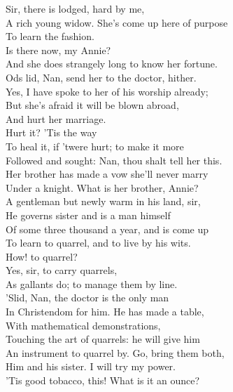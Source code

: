\documentclass[a4paper,oneside,12pt]{memoir}
\begin{document}
\begin{drama*}
\druggerspeaks {} Sir, there is lodged, hard by me,\\
A rich young widow. She's come up here of purpose\\
To learn the fashion.\\
\facespeaks {} Is there now, my Annie?\\
\druggerspeaks And she does strangely long to know her fortune.\\
\facespeaks Ods lid, Nan, send her to the doctor, hither.\\
\druggerspeaks Yes, I have spoke to her of his worship already;\\
But she's afraid it will be blown abroad,\\
And hurt her marriage.\\
\facespeaks {} Hurt it? 'Tis the way\\
To heal it, if 'twere hurt; to make it more\\
Followed and sought: Nan, thou shalt tell her this.\\
\druggerspeaks Her brother has made a vow she'll never marry\\
Under a knight.
\facespeaks {} What is her brother, Annie?\\
\druggerspeaks A gentleman but newly warm in his land, sir,\\
He governs sister and is a man himself\\
Of some three thousand a year, and is come up\\
To learn to quarrel, and to live by his wits.\\
\facespeaks How! to quarrel?\\
\druggerspeaks {} Yes, sir, to carry quarrels,\\
As gallants do; to manage them by line.\\
\facespeaks 'Slid, Nan, the doctor is the only man\\
In Christendom for him. He has made a table,\\
With mathematical demonstrations,\\
Touching the art of quarrels: he will give him\\
An instrument to quarrel by. Go, bring them both,\\
Him and his sister.
\druggerspeaks {} I will try my power.\\
\subtlespeaks 'Tis good tobacco, this! What is it an ounce?\\

\end{drama*}
\end{document}
